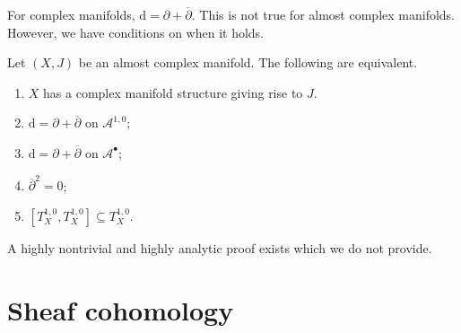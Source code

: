 For complex manifolds, $\mathrm{d} =\partial +\overline{\partial } $. This is not true for almost complex manifolds. However, we have conditions on when it holds.
\begin{theorem}\label{owo}
	Let $(X,J)$ be an almost complex manifold. The following are equivalent.
	\begin{enumerate}
		\item $X$ has a complex manifold structure giving rise to $J$.
		\item $\mathrm{d} =\partial + \overline{\partial } $ on $\mathcal{A} ^{1,0} $;
		\item $\mathrm{d} =\partial +\overline{\partial } $ on $\mathcal{A} ^{\bullet} $;
		\item $\overline{\partial } ^2=0$;
		\item $[T^{1,0}_X,T^{1,0}_X]\subseteq T^{1,0}_X$.
	\end{enumerate}
\end{theorem}
A highly nontrivial and highly analytic proof exists which we do not provide.

\chapter{Sheaf cohomology}

